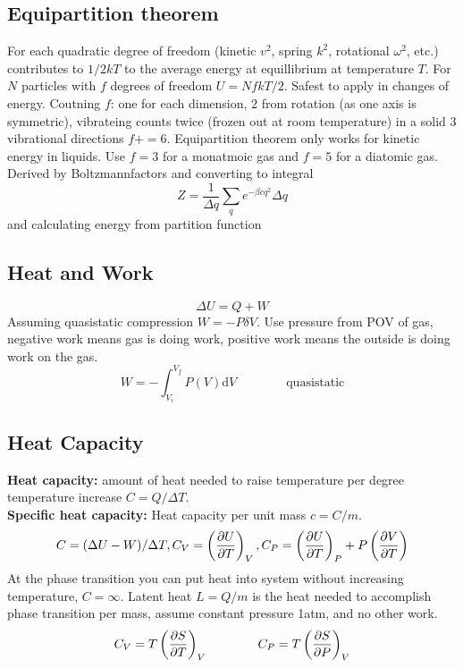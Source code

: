 \documentclass[a4paper, norsk, 8pt]{article}
\begin{document}
\begin{multicols*}{3}
\subsection*{\footnotesize  Equipartition theorem}
For each quadratic degree of freedom (kinetic $v^2$, spring $k^2$, rotational $\omega^2$, etc.) contributes to $1/2kT$ to the average energy at equillibrium at temperature $T$. For $N$ particles with $f$ degrees of freedom $U = NfkT/2$. Safest to apply in changes of energy. Coutning $f$: one for each dimension, $2$ from rotation (as one axis is symmetric), vibrateing counts twice (frozen out at room temperature) in a solid $3$ vibrational directions $f+=6$. Equipartition theorem only works for kinetic energy in liquids. Use $f=3$ for a monatmoic gas and $f=5$ for a diatomic gas.\\
Derived by Boltzmannfactors and converting to integral
\begin{equation*}
    Z = \frac{1}{\Delta q}\sum_q e^{-\beta c q^2}\Delta q
\end{equation*}
and calculating energy from partition function
\subsection*{\footnotesize  Heat and Work}
\begin{equation*}
  \Delta U = Q + W
\end{equation*}
Assuming quasistatic compression $W = -P\delta V$. Use pressure from POV of gas, negative work means gas is doing work, positive work means the outside is doing work on the gas.
\begin{equation*}
  W = -\int_{V_i}^{V_f}P(V) \mbox{d} V \qquad \qquad \text{quasistatic}
\end{equation*}

\subsection*{\footnotesize  Heat Capacity}
\textbf{Heat capacity:} amount of heat needed to raise temperature per degree temperature increase $C=Q/\Delta T$.\\
\textbf{Specific heat capacity:} Heat capacity per unit mass $c=C/m$.\\
\begin{equation*}
  C = (\Delta U - W)/\Delta T, C_V = \left(\pdv{U}{T}\right)_V, C_P = \left(\pdv{U}{T}\right)_P + P\left( \pdv{V}{T} \right)
\end{equation*}
At the phase transition you can put heat into system without increasing temperature, $C=\infty$. Latent heat $L=Q/m$ is the heat needed to accomplish phase transition per mass, assume constant pressure 1atm, and no other work.
\begin{equation*}
  C_V = T\left( \pdv{S}{T} \right)_V \qquad \qquad   C_P = T\left( \pdv{S}{P} \right)_V
\end{equation*}



\end{multicols*}
\end{document}
